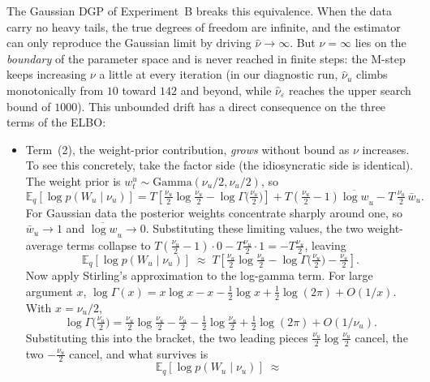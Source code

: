 \documentclass[11pt, a4paper, oneside]{article}
\begin{document}
The Gaussian DGP of Experiment~B breaks this equivalence. When the
data carry no heavy tails, the true degrees of freedom are infinite,
and the estimator can only reproduce the Gaussian limit by driving
$\hat{\nu} \to \infty$. But $\nu = \infty$ lies on the
\emph{boundary} of the parameter space and is never reached in finite
steps: the M-step keeps increasing $\nu$ a little at every iteration
(in our diagnostic run, $\hat{\nu}_u$ climbs monotonically from $10$
toward $142$ and beyond, while $\hat{\nu}_\varepsilon$ reaches the
upper search bound of $1000$). This unbounded drift has a direct
consequence on the three terms of the ELBO:
\begin{itemize}[leftmargin=1.5em, itemsep=3pt]
  \item Term~(2), the weight-prior contribution, \emph{grows} without
        bound as $\nu$ increases. To see this concretely, take the
        factor side (the idiosyncratic side is identical). The weight
        prior is $w^u_t \sim \mathrm{Gamma}(\nu_u/2,\nu_u/2)$, so
        \[
        \mathbb{E}_q[\log p(W_u\mid\nu_u)]
        = T\!\left[\tfrac{\nu_u}{2}\log\tfrac{\nu_u}{2}
        - \log\Gamma\!\big(\tfrac{\nu_u}{2}\big)\right]
        + T\!\left(\tfrac{\nu_u}{2}-1\right)\overline{\log w}_u
        - T\,\tfrac{\nu_u}{2}\,\bar{w}_u.
        \]
        For Gaussian data the posterior weights concentrate sharply
        around one, so $\bar{w}_u \to 1$ and $\overline{\log w}_u \to
        0$. Substituting these limiting values, the two weight-average
        terms collapse to
        $T(\tfrac{\nu_u}{2}-1)\cdot 0 - T\tfrac{\nu_u}{2}\cdot 1 =
        -T\tfrac{\nu_u}{2}$, leaving
        \[
        \mathbb{E}_q[\log p(W_u\mid\nu_u)]
        \;\approx\;
        T\!\left[\tfrac{\nu_u}{2}\log\tfrac{\nu_u}{2}
        - \log\Gamma\!\big(\tfrac{\nu_u}{2}\big)
        - \tfrac{\nu_u}{2}\right].
        \]
        Now apply Stirling's approximation to the log-gamma term. For
        large argument $x$, $\log\Gamma(x) = x\log x - x -
        \tfrac{1}{2}\log x + \tfrac{1}{2}\log(2\pi) + O(1/x)$. With
        $x = \nu_u/2$,
        \[
        \log\Gamma\!\big(\tfrac{\nu_u}{2}\big)
        = \tfrac{\nu_u}{2}\log\tfrac{\nu_u}{2}
        - \tfrac{\nu_u}{2}
        - \tfrac{1}{2}\log\tfrac{\nu_u}{2}
        + \tfrac{1}{2}\log(2\pi) + O(1/\nu_u).
        \]
        Substituting this into the bracket, the two leading pieces
        $\tfrac{\nu_u}{2}\log\tfrac{\nu_u}{2}$ cancel, the two
        $-\tfrac{\nu_u}{2}$ cancel, and what survives is
        \[
        \mathbb{E}_q[\log p(W_u\mid\nu_u)]
        \;\approx\;
\]
\end{itemize}
\end{document}
